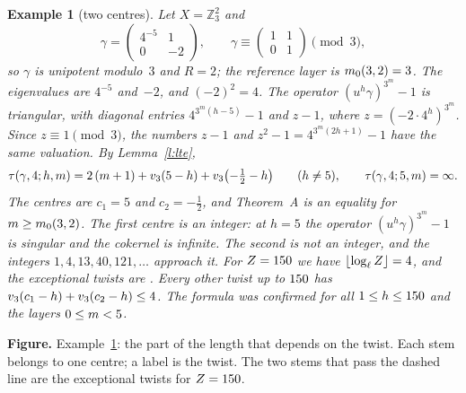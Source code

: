 \documentclass[11pt,a4paper]{article}
\newcommand{\Z}{\mathbb{Z}}
\newcommand{\m}[1]{\mbox{$#1$}}        %
\theoremstyle{plainx}
\theoremstyle{uprightx}
\newtheorem{example}[theorem]{Example}
\begin{document}
\begin{example}[two centres]\label{e:one}
Let \m{X=\Z_3^2} and
\[
\gamma=\begin{pmatrix}4^{-5}&1\\0&-2\end{pmatrix},\qquad \gamma\equiv\begin{pmatrix}1&1\\0&1\end{pmatrix}\pmod 3 ,
\]
so $\gamma$ is unipotent modulo~$3$ and \m{R=2}; the reference layer is \m{\mz{3}{2}=\ExMzero}. The eigenvalues are
$4^{-5}$ and~$-2$, and \m{(-2)^2=4}. The operator \m{(u^h\gamma)^{3^m}-1} is triangular, with diagonal entries
\m{4^{3^m(h-5)}-1} and \m{z-1}, where $z=(-2\cdot4^h)^{3^m}$. Since \m{z\equiv1\pmod 3}, the numbers \m{z-1} and
$z^2-1=4^{3^m(2h+1)}-1$ have the same valuation. By Lemma~\ref{l:lte},
\[
\tau(\gamma,4;h,m)=2\,(m+1)+v_{3}(5-h)+v_{3}\bigl(-\tfrac12-h\bigr)\qquad(h\ne5),\qquad\tau(\gamma,4;5,m)=\infty .
\]
The centres are \m{c_1=5} and \m{c_2=-\frac12}, and Theorem~A is an equality for \m{m\ge\mz{3}{2}}. The first centre is
an integer: at \m{h=5} the operator \m{(u^h\gamma)^{3^m}-1} is singular and the cokernel is infinite. The second
is not an integer, and the integers \m{1,4,13,40,121,\dots} approach it. For \m{Z=\ExZ} we have
\m{\lfloor\log_\ell Z\rfloor=\ExK}, and the exceptional twists are \ExExc. Every other twist up to $150$ has
\m{\vl{3}{c_1-h}+\vl{3}{c_2-h}\le\ExWorst}. The formula was confirmed for all \m{1\le h\le\ExZ} and the \ExLevels{} layers
\m{0\le m<\ExLevels}.
\end{example}

\par\vspace{2pt}
\noindent\makebox[\linewidth][c]{}
\par\vspace{-2pt}
{\fontsize{9.2}{12.4}\selectfont\color{inksoft}\noindent\textbf{Figure.} Example~\ref{e:one}: the part of the
length that depends on the twist. Each stem belongs to one centre; a label is the twist. The two stems that pass
the dashed line are the exceptional twists for \m{Z=\ExZ}.\par}
\end{document}
